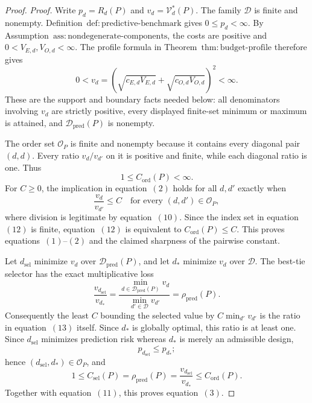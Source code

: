 \documentclass{article}
\begin{document}
\begin{proof}
\emph{Proof.}
Write \(p_d=R_d(P)\) and \(v_d=\mathcal V_d^*(P)\).  The family \(\mathcal D\) is finite and nonempty.  Definition~\(\mathrm{def{:}predictive\text{-}benchmark}\) gives \(0\le p_d<\infty\).  By Assumption~\(\mathrm{ass{:}nondegenerate\text{-}components}\), the costs are positive and \(0<V_{E,d},V_{O,d}<\infty\).  The profile formula in Theorem~\(\mathrm{thm{:}budget\text{-}profile}\) therefore gives
\[
 0<v_d=
 \left(\sqrt{c_{E,d}V_{E,d}}+
       \sqrt{c_{O,d}V_{O,d}}\right)^2<\infty .             \tag{10}
\]
These are the support and boundary facts needed below: all denominators involving \(v_d\) are strictly positive, every displayed finite-set minimum or maximum is attained, and \(\mathcal D_{\mathrm{pred}}(P)\) is nonempty.

The order set \(\mathcal O_P\) is finite and nonempty because it contains every diagonal pair \((d,d)\).  Every ratio \(v_d/v_{d'}\) on it is positive and finite, while each diagonal ratio is one.  Thus
\[
 1\le C_{\mathrm{ord}}(P)<\infty .                         \tag{11}
\]
For \(C\ge0\), the implication in equation~\((2)\) holds for all \(d,d'\) exactly when
\[
 \frac{v_d}{v_{d'}}\le C
 \quad\text{for every }(d,d')\in\mathcal O_P,             \tag{12}
\]
where division is legitimate by equation~\((10)\).  Since the index set in equation~\((12)\) is finite, equation~\((12)\) is equivalent to \(C_{\mathrm{ord}}(P)\le C\).  This proves equations~\((1)\)--\((2)\) and the claimed sharpness of the pairwise constant.

Let \(d_{\mathrm{sel}}\) minimize \(v_d\) over \(\mathcal D_{\mathrm{pred}}(P)\), and let \(d_*\) minimize \(v_d\) over \(\mathcal D\).  The best-tie selector has the exact multiplicative loss
\[
 \frac{v_{d_{\mathrm{sel}}}}{v_{d_*}}
 =\frac{\min_{d\in\mathcal D_{\mathrm{pred}}(P)}v_d}
        {\min_{d'\in\mathcal D}v_{d'}}
 =\rho_{\mathrm{pred}}(P).                                \tag{13}
\]
Consequently the least \(C\) bounding the selected value by \(C\min_{d'}v_{d'}\) is the ratio in equation~\((13)\) itself.  Since \(d_*\) is globally optimal, this ratio is at least one.  Since \(d_{\mathrm{sel}}\) minimizes prediction risk whereas \(d_*\) is merely an admissible design,
\[
 p_{d_{\mathrm{sel}}}\le p_{d_*};
\]
hence \((d_{\mathrm{sel}},d_*)\in\mathcal O_P\), and
\[
 1\le C_{\mathrm{sel}}(P)=\rho_{\mathrm{pred}}(P)
 =\frac{v_{d_{\mathrm{sel}}}}{v_{d_*}}
 \le C_{\mathrm{ord}}(P).                                 \tag{14}
\]
Together with equation~\((11)\), this proves equation~\((3)\).


\end{proof}
\end{document}
